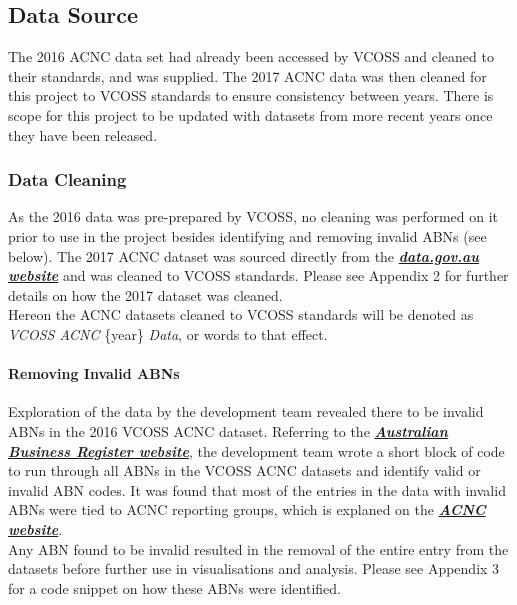 \documentclass[
  11pt,
]{article}
\begin{document}
\hypertarget{data-source}{%
\subsection{Data Source}\label{data-source}}

The 2016 ACNC data set had already been accessed by VCOSS and cleaned to their standards, and was supplied. The 2017 ACNC data was then cleaned for this project to VCOSS standards to ensure consistency between years. There is scope for this project to be updated with datasets from more recent years once they have been released.

\hypertarget{data-cleaning}{%
\subsubsection{Data Cleaning}\label{data-cleaning}}

As the 2016 data was pre-prepared by VCOSS, no cleaning was performed on it prior to use in the project besides identifying and removing invalid ABNs (see below). The 2017 ACNC dataset was sourced directly from the \href{https://data.gov.au/dataset/ds-dga-a1f8626c-fefb-4c4d-86ea-deaa04fb1f6e/details?q=}{\textbf{\emph{data.gov.au website}}} and was cleaned to VCOSS standards. Please see Appendix 2 for further details on how the 2017 dataset was cleaned.\\
Hereon the ACNC datasets cleaned to VCOSS standards will be denoted as \emph{VCOSS ACNC} \{year\} \emph{Data}, or words to that effect.

\hypertarget{removing-invalid-abns}{%
\paragraph{Removing Invalid ABNs}\label{removing-invalid-abns}}

Exploration of the data by the development team revealed there to be invalid ABNs in the 2016 VCOSS ACNC dataset. Referring to the \href{https://abr.business.gov.au/Help/AbnFormat}{\textbf{\emph{Australian Business Register website}}}, the development team wrote a short block of code to run through all ABNs in the VCOSS ACNC datasets and identify valid or invalid ABN codes. It was found that most of the entries in the data with invalid ABNs were tied to ACNC reporting groups, which is explaned on the \href{https://www.acnc.gov.au/for-charities/manage-your-charity/obligations-acnc/reporting-annually-acnc/group-reporting-and-bulk}{\textbf{\emph{ACNC website}}}.\\
Any ABN found to be invalid resulted in the removal of the entire entry from the datasets before further use in visualisations and analysis. Please see Appendix 3 for a code snippet on how these ABNs were identified.
\end{document}
